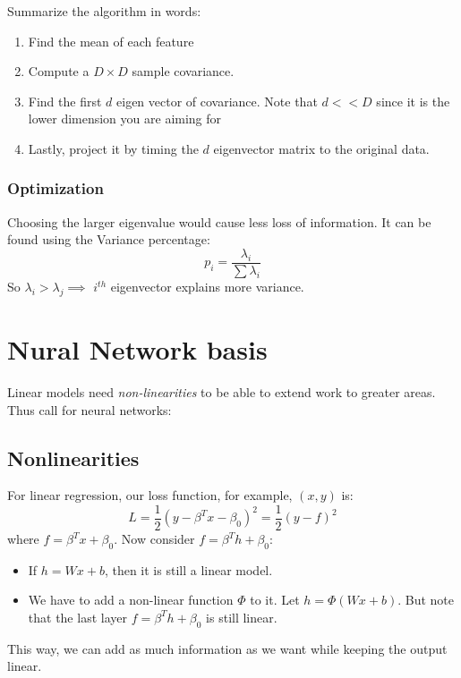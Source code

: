 \documentclass[letterpaper,12pt]{article}
\begin{document}
    Summarize the algorithm in words:
    \begin{enumerate}
        \item Find the mean of each feature
        \item Compute a $D\times D$ sample covariance.
        \item Find the first $d$ eigen vector of covariance. Note that $d<<D$ since it is the lower dimension you are aiming for
        \item Lastly, project it by timing the $d$ eigenvector matrix to the original data. 
    \end{enumerate}

\subsubsection{Optimization}
Choosing the larger eigenvalue would cause less loss of information. It can be found using the Variance percentage:
\[p_i = \frac{\lambda_i}{\sum\lambda_i}\]
So $\lambda_i>\lambda_j \implies$ $i^{th}$ eigenvector explains more variance.

\section{Nural Network basis}

Linear models need \textit{non-linearities} to be able to extend work to greater areas. Thus call for neural networks:
\subsection{Nonlinearities}
For linear regression, our loss function, for example, $(x,y)$ is:
\[L=\frac{1}{2}(y-\beta^T x-\beta_0)^2=\frac{1}{2}(y-f)^2\] 
where $f=\beta^T x+\beta_0$. Now consider $f=\beta^T h+\beta_0$:
\begin{itemize}
    \item If $h=Wx+b$, then it is still a linear model.
    \item We have to add a non-linear function $\Phi$ to it. Let $h=\Phi(Wx+b)$. But note that the last layer $f=\beta^T h+\beta_0$ is still linear.
\end{itemize}
This way, we can add as much information as we want while keeping the output linear.
\end{document}
